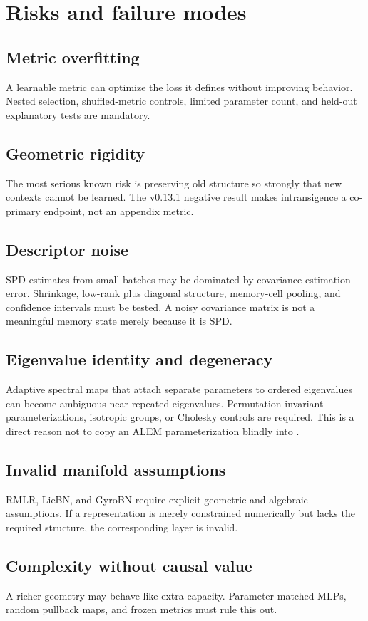 \section{Risks and failure modes}

\subsection{Metric overfitting}
A learnable metric can optimize the loss it defines without improving behavior. Nested selection, shuffled-metric controls, limited parameter count, and held-out explanatory tests are mandatory.

\subsection{Geometric rigidity}
The most serious known risk is preserving old structure so strongly that new contexts cannot be learned. The v0.13.1 negative result makes intransigence a co-primary endpoint, not an appendix metric.

\subsection{Descriptor noise}
SPD estimates from small batches may be dominated by covariance estimation error. Shrinkage, low-rank plus diagonal structure, memory-cell pooling, and confidence intervals must be tested. A noisy covariance matrix is not a meaningful memory state merely because it is SPD.

\subsection{Eigenvalue identity and degeneracy}
Adaptive spectral maps that attach separate parameters to ordered eigenvalues can become ambiguous near repeated eigenvalues. Permutation-invariant parameterizations, isotropic groups, or Cholesky controls are required. This is a direct reason not to copy an ALEM parameterization blindly into \MMALS{}.

\subsection{Invalid manifold assumptions}
RMLR, LieBN, and GyroBN require explicit geometric and algebraic assumptions. If a representation is merely constrained numerically but lacks the required structure, the corresponding layer is invalid.

\subsection{Complexity without causal value}
A richer geometry may behave like extra capacity. Parameter-matched MLPs, random pullback maps, and frozen metrics must rule this out.

